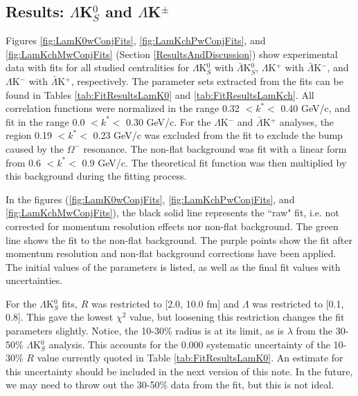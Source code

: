 \documentclass[../AnalysisNoteJBuxton.tex]{subfiles}
\begin{document}
\subsection{Results: \texorpdfstring{$\Lambda$K$^{0}_{S}$ and $\Lambda$K$^{\pm}$}{TEXT}}
\label{ResultsLamK}

Figures \ref{fig:LamK0wConjFits}, \ref{fig:LamKchPwConjFits}, and \ref{fig:LamKchMwConjFits} (Section \ref{ResultsAndDiscussion}) show experimental data with fits for all studied centralities for $\Lambda$K$^{0}_{S}$ with $\bar{\Lambda}$K$^{0}_{S}$, $\Lambda$K$^{+}$ with $\bar{\Lambda}$K$^{-}$, and $\Lambda$K$^{-}$ with $\bar{\Lambda}$K$^{+}$, respectively.
The parameter sets extracted from the fits can be found in Tables \ref{tab:FitResultsLamK0} and \ref{tab:FitResultsLamKch}.
All correlation functions were normalized in the range 0.32 $< k^{*} <$ 0.40 GeV/c, and fit in the range 0.0 $< k^{*} <$ 0.30 GeV/c.
For the $\Lambda$K$^{-}$ and $\bar{\Lambda}$K$^{+}$ analyses, the region 0.19 $< k^{*} <$ 0.23 GeV/c was excluded from the fit to exclude the bump caused by the $\Omega^{-}$ resonance.
The non-flat background was fit with a linear form from 0.6 $< k^{*} <$ 0.9 GeV/c.
The theoretical fit function was then multiplied by this background during the fitting process.

In the figures (\ref{fig:LamK0wConjFits}, \ref{fig:LamKchPwConjFits}, and \ref{fig:LamKchMwConjFits}), the black solid line represents the ``raw" fit, i.e. not corrected for momentum resolution effects nor non-flat background.
The green line shows the fit to the non-flat background.  The purple points show the fit after momentum resolution and non-flat background corrections have been applied.
The initial values of the parameters is listed, as well as the final fit values with uncertainties.

For the $\Lambda$K$^{0}_{S}$ fits, $R$ was restricted to [2.0, 10.0 fm] and $\Lambda$ was restricted to [0.1, 0.8].
This gave the lowest $\chi^{2}$ value, but loosening this restriction changes the fit parameters slightly.
Notice, the 10-30\% radius is at its limit, as is $\lambda$ from the 30-50\% $\Lambda$K$^{0}_{S}$ analysis.
This accounts for the 0.000 systematic uncertainty of the 10-30\% $R$ value currently quoted in Table \ref{tab:FitResultsLamK0}.
An estimate for this uncertainty should be included in the next version of this note.
In the future, we may need to throw out the 30-50\% data from the fit, but this is not ideal.
\end{document}
